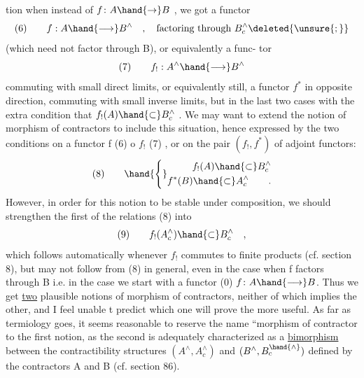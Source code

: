 
tion when instead of $f\colon A \hand{\to} B$ , we got a functor
\[ (6) \qquad f : A \hand{\longrightarrow} B^{\wedge} \quad , \quad \text{factoring through } B^{\wedge}_{c} \deleted{\unsure{;}} \]
 (which need not factor through B), or equivalently a func-%
tor
\[ (7) \qquad f_{!} : A^{\wedge} \hand{\longrightarrow} B^{\wedge} \]
commuting with small direct limits, or equivalently still, a functor
$f^{*}$ in opposite direction, commuting with small inverse limits, but
in the last two cases with the extra condition that $f_{!}(A) \hand{\subset} B^{\wedge}_{c}$ . We
may want to extend the notion of morphism of contractors to include
this situation, hence expressed by the two  conditions on a functor
f (6) o $f_{!}$ (7) , or on the pair $(f_{!},f^{*})$ of adjoint functors:
\[ (8) \qquad \hand{\Biggl\{}\begin{aligned} f_{!}(A) \hand{\subset} B^{\wedge}_{c} \\ f^{*}(B) \hand{\subset} A^{\wedge}_{c} \qquad . \end{aligned} \]
However, in order for this notion to be stable under composition,
we should strengthen the first of the relations (8) into
\[ (9) \qquad f_{!}(A^{\wedge}_{c}) \hand{\subset} B^{\wedge}_{c} \quad , \]
which follows automatically whenever $f_{!}$ commutes to finite products
(cf. section 8), but may not follow from (8) in general, even in
the case when f factors through B i.e. in the case we start with a
functor (0) $f\colon A \hand{\longrightarrow} B$. Thus we get \uline{two} plausible notions of  morphism
of contractors, neither of which implies the other, and I feel unable
t predict which one will prove the more useful. As far as termiology
goes, it seems reasonable to reserve the name ``morphism of contractor
to the first notion, as the second is adequately characterized as a
\uline{bimorphism} between the contractibility structures $(A^{\wedge},A^{\wedge}_{c})$ and $(B^{\wedge},B^{\hand{\wedge}}_{c})$
defined by the contractors A and B (cf. section 86).

